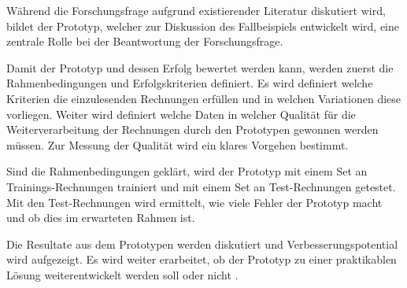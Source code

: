 \documentclass{hwz}
\begin{document}
Während die Forschungsfrage aufgrund existierender Literatur diskutiert wird, bildet der Prototyp, welcher zur Diskussion des Fallbeispiels entwickelt wird, eine zentrale Rolle bei der Beantwortung der Forschungsfrage.



Damit der Prototyp und dessen Erfolg bewertet werden kann, werden zuerst die Rahmenbedingungen und Erfolgskriterien definiert. Es wird definiert welche Kriterien die einzulesenden Rechnungen erfüllen und in welchen Variationen diese vorliegen. Weiter wird definiert welche Daten in welcher Qualität für die Weiterverarbeitung der Rechnungen durch den Prototypen gewonnen werden müssen. Zur Messung der Qualität wird ein klares Vorgehen bestimmt.


Sind die Rahmenbedingungen geklärt, wird der Prototyp mit einem Set an Trainings-Rechnungen trainiert und mit einem Set an Test-Rechnungen getestet. Mit den Test-Rechnungen wird ermittelt, wie viele Fehler der Prototyp macht und ob dies im erwarteten Rahmen ist.

Die Resultate aus dem Prototypen werden diskutiert und Verbesserungspotential wird aufgezeigt. Es wird weiter erarbeitet, ob der Prototyp zu einer praktikablen Lösung weiterentwickelt werden soll oder nicht .

\end{document}
